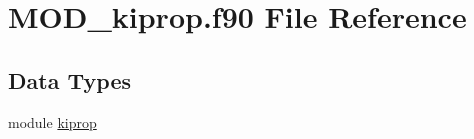 \hypertarget{MOD__kiprop_8f90}{\section{M\-O\-D\-\_\-kiprop.\-f90 File Reference}
\label{MOD__kiprop_8f90}
}
\subsection*{Data Types}
\begin{DoxyCompactItemize}
\item 
module \hyperlink{classkiprop}{kiprop}
\end{DoxyCompactItemize}
